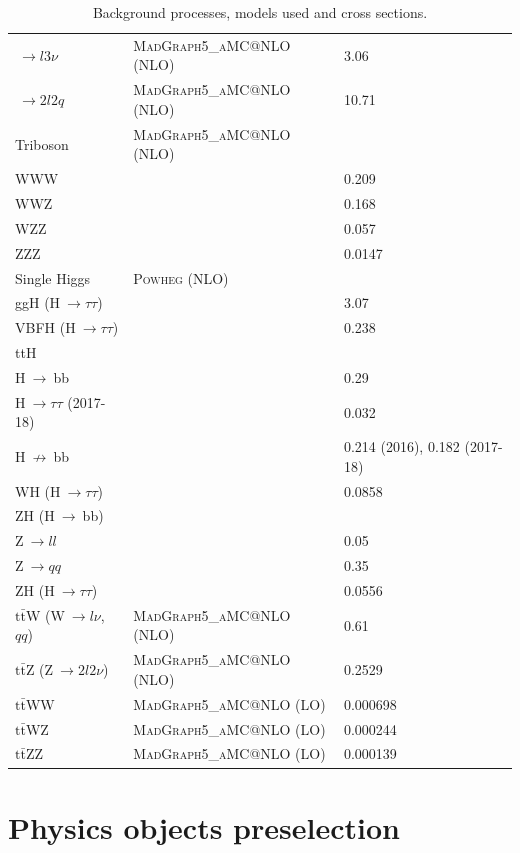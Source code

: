 \documentclass[../main.tex]{subfiles}
\begin{document}
\begin{table}[p]
\begin{footnotesize}
\begin{center}
\begin{tabular}{l | l | l}
		\quad$~\to l3\nu$ & \textsc{MadGraph5\_aMC@NLO} (NLO) & 3.06 \\
		\quad$~\to 2l2q$ & \textsc{MadGraph5\_aMC@NLO} (NLO) & 10.71 \\
\hline
		Triboson & \textsc{MadGraph5\_aMC@NLO} (NLO) & \\
		WWW &  & 0.209 \\
		WWZ &  & 0.168 \\
		WZZ &  & 0.057 \\
		ZZZ &  & 0.0147 \\
\hline
		Single Higgs & \textsc{Powheg} (NLO) & \\
		ggH (H$~\to\tau\tau$) & & 3.07 \\
		VBFH  (H$~\to\tau\tau$) & & 0.238 \\
		ttH & & \\
		\quad H$~\to~$bb & & 0.29 \\
		\quad H$~\to\tau\tau$ (2017-18) & & 0.032 \\
		\quad H$~\not\to~$bb & & 0.214 (2016), 0.182 (2017-18) \\
		WH (H$~\to\tau\tau$) & & 0.0858 \\
		ZH (H$~\to~$bb) & & \\
		\quad Z$~\to ll$ & & 0.05 \\
		\quad Z$~\to qq$ & & 0.35 \\
		ZH (H$~\to\tau\tau$) & & 0.0556\\
\hline
		$\text{t}\bar{\text{t}}$W (W$~\to l\nu$, $qq$) & \textsc{MadGraph5\_aMC@NLO} (NLO) & 0.61 \\
		$\text{t}\bar{\text{t}}$Z (Z$~\to 2l2\nu$) & \textsc{MadGraph5\_aMC@NLO} (NLO) & 0.2529 \\
		$\text{t}\bar{\text{t}}$WW & \textsc{MadGraph5\_aMC@NLO} (LO) & 0.000698 \\
		$\text{t}\bar{\text{t}}$WZ & \textsc{MadGraph5\_aMC@NLO} (LO) & 0.000244 \\
		$\text{t}\bar{\text{t}}$ZZ & \textsc{MadGraph5\_aMC@NLO} (LO) & 0.000139 \\
	\end{tabular}
\end{center}
\end{footnotesize}
\caption{Background processes, models used and cross sections.}
\label{hh:analysis:samples}
\end{table}




\section{Physics objects preselection}
\label{hh:sec:objects}
\end{document}
